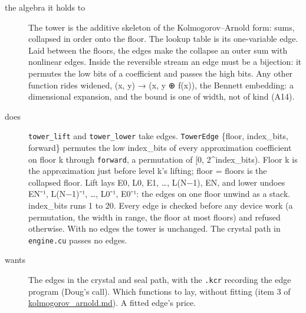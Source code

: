 \begin{description}
\item[{the algebra it holds to}] The tower is the additive skeleton of the Kolmogorov–Arnold form: sums, collapsed in order onto the floor. The lookup table is its one-variable edge. Laid between the floors, the edges make the collapse an outer sum with nonlinear edges. Inside the reversible stream an edge must be a bijection: it permutes the low bits of a coefficient and passes the high bits. Any other function rides widened, (x, y) → (x, y ⊕ f(x)), the Bennett embedding: a dimensional expansion, and the bound is one of width, not of kind (A14).
\item[{does}] \texttt{tower\_\allowbreak{}lift} and \texttt{tower\_\allowbreak{}lower} take edges. \texttt{Tower\allowbreak{}Edge} \{floor, index\_\allowbreak{}bits, forward\} permutes the low index\_\allowbreak{}bits of every approximation coefficient on floor k through \texttt{forward}, a permutation of [0, 2\textasciicircum{}index\_\allowbreak{}bits). Floor k is the approximation just before level k's lifting; floor = floors is the collapsed floor. Lift lays E0, L0, E1, …, L(N−1), EN, and lower undoes EN⁻¹, L(N−1)⁻¹, …, L0⁻¹, E0⁻¹: the edges on one floor unwind as a stack. index\_\allowbreak{}bits runs 1 to 20. Every edge is checked before any device work (a permutation, the width in range, the floor at most floors) and refused otherwise. With no edges the tower is unchanged. The crystal path in \texttt{engine.\allowbreak{}cu} passes no edges.
\item[{wants}] The edges in the crystal and seal path, with the \texttt{.\allowbreak{}kcr} recording the edge program (Doug's call). Which functions to lay, without fitting (item 3 of \hyperref[chap:kolmogorov-arnold]{kolmogorov\_\allowbreak{}arnold.md}). A fitted edge's price.

\end{description}
